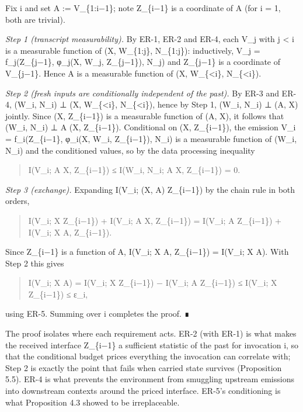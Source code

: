 \documentclass[
  11pt,
]{article}
\begin{document}
Fix i and set A := V\_\{1:i−1\}; note Z\_\{i−1\} is a coordinate of A
(for i = 1, both are trivial).

\emph{Step 1 (transcript measurability).} By ER-1, ER-2 and ER-4, each
V\_j with j \textless{} i is a measurable function of (X, W\_\{1:j\},
N\_\{1:j\}): inductively, V\_j = f\_j(Z\_\{j−1\}, φ\_j(X, W\_j,
Z\_\{j−1\}), N\_j) and Z\_\{j−1\} is a coordinate of V\_\{j−1\}. Hence A
is a measurable function of (X, W\_\{\textless i\}, N\_\{\textless i\}).

\emph{Step 2 (fresh inputs are conditionally independent of the past).}
By ER-3 and ER-4, (W\_i, N\_i) ⊥ (X, W\_\{\textless i\},
N\_\{\textless i\}), hence by Step 1, (W\_i, N\_i) ⊥ (A, X) jointly.
Since (X, Z\_\{i−1\}) is a measurable function of (A, X), it follows
that (W\_i, N\_i) ⊥ A \textbar{} (X, Z\_\{i−1\}). Conditional on (X,
Z\_\{i−1\}), the emission V\_i = f\_i(Z\_\{i−1\}, φ\_i(X, W\_i,
Z\_\{i−1\}), N\_i) is a measurable function of (W\_i, N\_i) and the
conditioned values, so by the data processing inequality

\begin{quote}
I(V\_i; A \textbar{} X, Z\_\{i−1\}) ≤ I(W\_i, N\_i; A \textbar{} X,
Z\_\{i−1\}) = 0.
\end{quote}

\emph{Step 3 (exchange).} Expanding I(V\_i; (X, A) \textbar{}
Z\_\{i−1\}) by the chain rule in both orders,

\begin{quote}
I(V\_i; X \textbar{} Z\_\{i−1\}) + I(V\_i; A \textbar{} X, Z\_\{i−1\}) =
I(V\_i; A \textbar{} Z\_\{i−1\}) + I(V\_i; X \textbar{} A, Z\_\{i−1\}).
\end{quote}

Since Z\_\{i−1\} is a function of A, I(V\_i; X \textbar{} A, Z\_\{i−1\})
= I(V\_i; X \textbar{} A). With Step 2 this gives

\begin{quote}
I(V\_i; X \textbar{} A) = I(V\_i; X \textbar{} Z\_\{i−1\}) − I(V\_i; A
\textbar{} Z\_\{i−1\}) ≤ I(V\_i; X \textbar{} Z\_\{i−1\}) ≤ ε\_i,
\end{quote}

using ER-5. Summing over i completes the proof. ∎

The proof isolates where each requirement acts. ER-2 (with ER-1) is what
makes the received interface Z\_\{i−1\} a sufficient statistic of the
past for invocation i, so that the conditional budget prices everything
the invocation can correlate with; Step 2 is exactly the point that
fails when carried state survives (Proposition 5.5). ER-4 is what
prevents the environment from smuggling upstream emissions into
downstream contexts around the priced interface. ER-5's conditioning is
what Proposition 4.3 showed to be irreplaceable.
\end{document}

